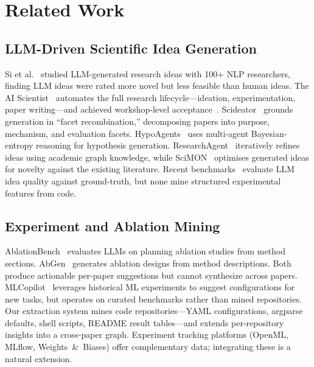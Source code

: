 \documentclass[conference]{IEEEtran}
\begin{document}
\section{Related Work}

\subsection{LLM-Driven Scientific Idea Generation}

Si et al.~\cite{si2024llmideas} studied LLM-generated research ideas with 100+ NLP researchers, finding LLM ideas were rated more novel but less feasible than human ideas.
The AI Scientist~\cite{lu2024aiscientist} automates the full research lifecycle---ideation, experimentation, paper writing---and achieved workshop-level acceptance~\cite{yamada2025aiscientistv2}.
Scideator~\cite{radensky2025scideator} grounds generation in ``facet recombination,'' decomposing papers into purpose, mechanism, and evaluation facets.
HypoAgents~\cite{hypoagents2025} uses multi-agent Bayesian-entropy reasoning for hypothesis generation.
ResearchAgent~\cite{baek2024researchagent} iteratively refines ideas using academic graph knowledge, while SciMON~\cite{wang2024scimon} optimises generated ideas for novelty against the existing literature.
Recent benchmarks~\cite{researchbench2025} evaluate LLM idea quality against ground-truth, but none mine structured experimental features from code.

\subsection{Experiment and Ablation Mining}

AblationBench~\cite{abramovich2025ablationbench} evaluates LLMs on planning ablation studies from method sections.
AbGen~\cite{zhao2025abgen} generates ablation designs from method descriptions.
Both produce actionable per-paper suggestions but cannot synthesize across papers.
MLCopilot~\cite{zhang2024mlcopilot} leverages historical ML experiments to suggest configurations for new tasks, but operates on curated benchmarks rather than mined repositories.
Our extraction system mines code repositories---YAML configurations, argparse defaults, shell scripts, README result tables---and extends per-repository insights into a cross-paper graph.
Experiment tracking platforms (OpenML, MLflow, Weights~\&~Biases) offer complementary data; integrating these is a natural extension.
\end{document}
